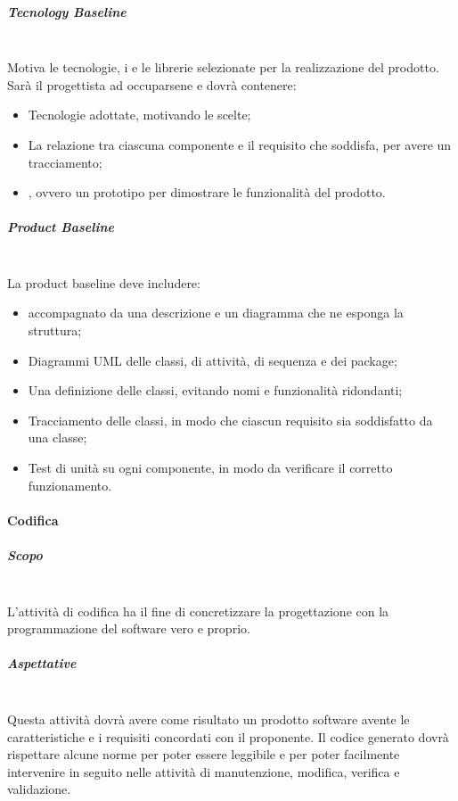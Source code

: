 \subparagraph{Tecnology Baseline} \mbox{} \\
Motiva le tecnologie, i  e le librerie selezionate per la realizzazione del prodotto. Sarà il progettista ad occuparsene e dovrà contenere:
\begin{itemize}
\item Tecnologie adottate, motivando le scelte;
\item La relazione tra ciascuna componente e il requisito che soddisfa, per avere un tracciamento;  
\item \textbf{}, ovvero un prototipo per dimostrare le funzionalità del prodotto.
\end{itemize}
\subparagraph{Product Baseline} \mbox{} \\
La product baseline deve includere:
\begin{itemize}
	\item {} accompagnato da una descrizione e un diagramma che ne esponga la struttura;
	\item Diagrammi UML delle classi, di attività, di sequenza e dei package;
	\item Una definizione delle classi, evitando nomi e funzionalità ridondanti;
	\item Tracciamento delle classi, in modo che ciascun requisito sia soddisfatto da una classe;
	\item Test di unità su ogni componente, in modo da verificare il corretto funzionamento.
\end{itemize}
\paragraph{Codifica}

\subparagraph{Scopo}  \mbox{} \\
L'attività di codifica ha il fine di concretizzare la progettazione con la programmazione del software vero e proprio.

\subparagraph{Aspettative} \mbox{} \\
Questa attività dovrà avere come risultato un prodotto software avente le caratteristiche e i requisiti concordati con il proponente. Il codice generato dovrà rispettare alcune norme per poter essere leggibile e per poter facilmente intervenire in seguito nelle attività di manutenzione, modifica, verifica e validazione.

